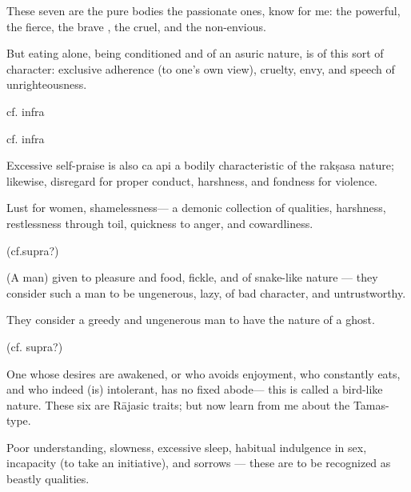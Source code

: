 \begin{translation}
\begin{tt}
\item[88]

These seven are the pure bodies  the passionate ones, know for me: the powerful, the fierce, the brave , the cruel, and the non-envious.

\item[89]

But eating alone, being conditioned and of an asuric nature, is of this sort of character: exclusive adherence (to one’s own view), cruelty, envy, and speech of unrighteousness.

\item[90]  cf. infra

\item[91] cf. infra

\item[92]

Excessive self-praise  is also ca api a bodily characteristic of the rakṣasa nature; likewise, disregard for proper conduct, harshness, and fondness for violence.


\item[93]

Lust for women, shamelessness— a demonic collection of qualities, harshness, restlessness  through toil, quickness to anger, and cowardliness.

\item[90] (cf.supra?)

(A man) given to pleasure and food, fickle, and of snake-like nature — they consider such a man  to be ungenerous, lazy, of bad character, and untrustworthy.

\item[94]

They consider a greedy and  ungenerous man to have the nature of a ghost.

\item[91]  (cf. supra?)

One whose desires are awakened, or who avoids enjoyment,
who constantly eats, and who indeed (is) intolerant, has no fixed abode— this is called a bird-like nature. These six are Rājasic traits; but now learn from me about the Tamas-type.

\item[95]

Poor understanding, slowness, excessive sleep, habitual indulgence in sex, incapacity (to take an initiative), and sorrows — these are to be recognized as beastly qualities.

\item[96]


\end{tt}
\end{translation}
